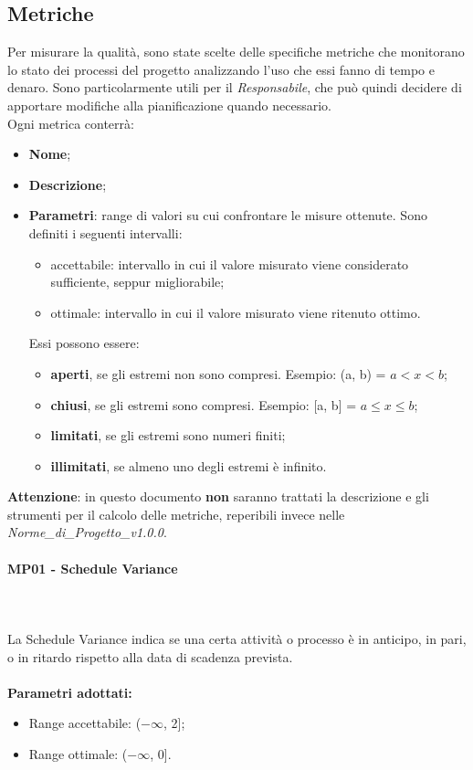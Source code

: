 \subsection{Metriche}
Per misurare la qualità, sono state scelte delle specifiche metriche che monitorano lo stato dei processi del progetto analizzando l’uso che essi fanno di tempo e denaro. Sono particolarmente utili per il \textit{Responsabile}, che può quindi decidere di apportare modifiche alla pianificazione quando necessario.\\
Ogni metrica conterrà:
\begin{itemize}
\item \textbf{Nome};
\item \textbf{Descrizione};
\item \textbf{Parametri}: range di valori su cui confrontare le misure ottenute. Sono definiti i seguenti intervalli: \begin{itemize}
\item accettabile: intervallo in cui il valore misurato viene considerato sufficiente, seppur migliorabile;
\item ottimale: intervallo in cui il valore misurato viene ritenuto ottimo.
\end{itemize}
Essi possono essere: \begin{itemize}
\item \textbf{aperti}, se gli estremi non sono compresi. Esempio: (a, b) = $a < x < b$; 
\item \textbf{chiusi}, se gli estremi sono compresi. Esempio: [a, b] = $a \leq x \leq b$;
\item \textbf{limitati}, se gli estremi sono numeri finiti;
\item \textbf{illimitati}, se almeno uno degli estremi è infinito.
\end{itemize}
\end{itemize}
\textbf{Attenzione}: in questo documento \textbf{non} saranno trattati la descrizione e gli strumenti per il calcolo delle metriche, reperibili invece nelle \textit{Norme\_di\_Progetto\_v1.0.0}.

\paragraph{MP01 - Schedule Variance} \mbox{} \\ \mbox{} \\
La Schedule Variance indica se una certa attività o processo è in anticipo, in pari, o in ritardo rispetto alla data di scadenza prevista. \\ \\ 
\textbf{Parametri adottati:} 
\begin{itemize}
\item Range accettabile: ($ -\infty $, 2];
\item Range ottimale: ($ -\infty $, 0].
\end{itemize}

